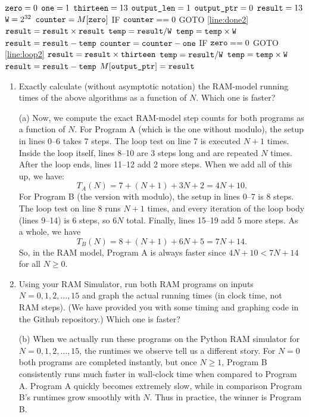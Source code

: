 \documentclass[11pt]{article}
\begin{document}
\begin{enumerate}
\begin{algorithm}[H]
\setcounter{AlgoLine}{-1}
$\texttt{zero} = 0$\;
$\texttt{one} = 1$\;
$\texttt{thirteen} = 13$\;
$\texttt{output\_len} = 1$\;
$\texttt{output\_ptr} = 0$\;
$\texttt{result} = 13$\;
$\texttt{W} = 2^{32}$\;
$\texttt{counter} = M[\texttt{zero}]$\;
\Indp
IF $\texttt{counter} == 0$ GOTO \ref{line:done2}\; \label{line:loop2}
$\texttt{result} = \texttt{result} \times \texttt{result}$\;
$\texttt{temp} = \texttt{result} / \texttt{W}$\;
$\texttt{temp} = \texttt{temp} \times \texttt{W}$\;
$\texttt{result} = \texttt{result} - \texttt{temp}$\;
$\texttt{counter} = \texttt{counter} - \texttt{one}$\;
IF $\texttt{zero} == 0$ GOTO \ref{line:loop2}\;
\Indm
$\texttt{result} = \texttt{result} \times \texttt{thirteen}$\;
\label{line:done2}
$\texttt{temp} = \texttt{result} / \texttt{W}$\;
$\texttt{temp} = \texttt{temp} \times \texttt{W}$\;
$\texttt{result} = \texttt{result} - \texttt{temp}$\;
$M[\texttt{output\_ptr}]=\texttt{result}$\; 
\end{algorithm}


\begin{enumerate}
    \item Exactly calculate (without asymptotic notation) the RAM-model running times of the above algorithms as a function of $N$.
    Which one is faster? \label{itm:RAMtime} 
    
(a) Now, we compute the exact RAM-model step counts for both programs as a function of $N$. For Program A (which is the one without modulo), the setup in lines 0--6 takes 7 steps. The loop test on line 7 is executed $N+1$ times. Inside the loop itself, lines 8--10 are 3 steps long and are repeated $N$ times. After the loop ends, lines 11--12 add 2 more steps. When we add all of this up, we have:
$$T_A(N) = 7 + (N+1) + 3N + 2 = 4N + 10.$$
For Program B (the version with modulo), the setup in lines 0--7 is 8 steps. The loop test on line 8 runs $N+1$ times, and every iteration of the loop body (lines 9--14) is 6 steps, so $6N$ total. Finally, lines 15--19 add 5 more steps. As a whole, we have
$$T_B(N) = 8 + (N+1) + 6N + 5 = 7N + 14.$$
So, in the RAM model, Program A is always faster since $4N+10 < 7N+14$ for all $N \geq 0$.

    
    \item Using your RAM Simulator, run both RAM programs on inputs $N=0,1,2,\ldots,15$ and graph the actual running times (in clock time, not RAM steps).  (We have provided you with some timing and graphing code in the Github repository.) Which one is faster?  \label{itm:realtime}


(b) When we actually run these programs on the Python RAM simulator for $N = 0,1,2,\dots,15$, the runtimes we observe tell us a different story. For $N=0$ both programs are completed instantly, but once $N \geq 1$, Program B consistently runs much faster in wall-clock time when compared to Program A. Program A quickly becomes extremely slow, while in comparison Program B’s runtimes grow smoothly with $N$. Thus in practice, the winner is Program B.


\end{enumerate}
\end{enumerate}
\end{document}
